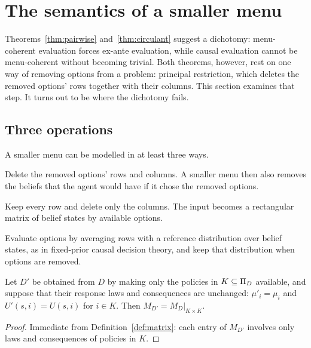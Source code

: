 \section{The semantics of a smaller menu}\label{sec:menus}

Theorems~\ref{thm:pairwise} and~\ref{thm:circulant} suggest a dichotomy: menu-coherent evaluation
forces ex-ante evaluation, while causal evaluation cannot be menu-coherent without becoming trivial.
Both theorems, however, rest on one way of removing options from a problem: principal restriction,
which deletes the removed options' rows together with their columns. This section examines that
step. It turns out to be where the dichotomy fails.

\subsection{Three operations}

A smaller menu can be modelled in at least three ways.
\begin{description}[font=\normalfont\itshape,leftmargin=1.4em,itemsep=.35em]
  \item[Principal restriction ($\Cpr$).] Delete the removed options' rows and columns. A smaller menu
        then also removes the beliefs that the agent would have if it chose the removed options.
  \item[Column restriction ($\Ccol$).] Keep every row and delete only the columns. The input becomes a
        rectangular matrix of belief states by available options.
  \item[Fixed-reference restriction ($\Cref$).] Evaluate options by averaging rows with a reference
        distribution over belief states, as in fixed-prior causal decision theory, and keep that
        distribution when options are removed.
\end{description}

\begin{proposition}\label{prop:principal}
Let $D'$ be obtained from $D$ by making only the policies in $K\subseteq\Pi_D$ available, and suppose
that their response laws and consequences are unchanged: $\mu'_i=\mu_i$ and $U'(s,i)=U(s,i)$ for
$i\in K$. Then $M_{D'}=M_D|_{K\times K}$.
\end{proposition}

\begin{proof}
Immediate from Definition~\ref{def:matrix}: each entry of $M_{D'}$ involves only laws and
consequences of policies in $K$.
\end{proof}

